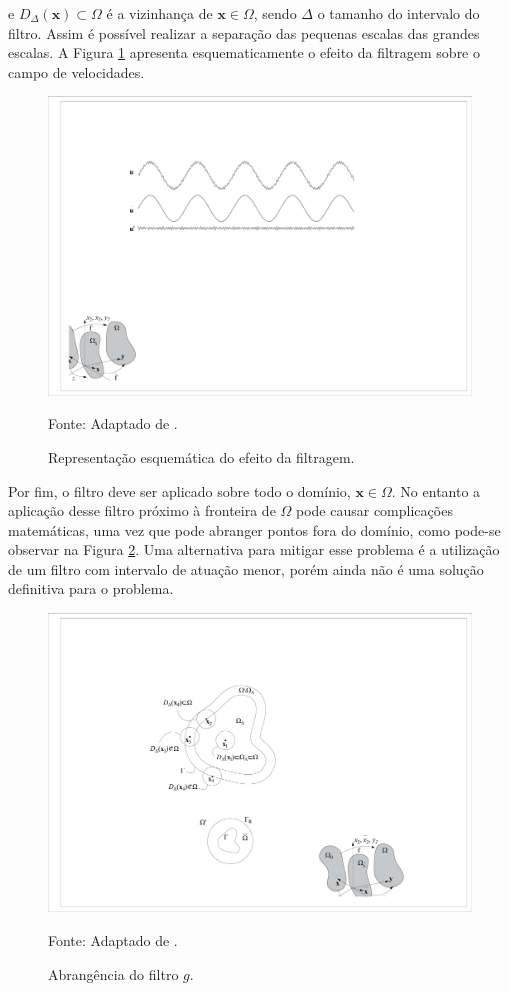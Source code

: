 \documentclass[_ArquivoPrincipal.tex]{subfiles}
\begin{document}
\noindent e $D_\Delta(\mathbf{x})\subset\Omega$ é a vizinhança de $\mathbf{x}\in\Omega$, sendo $\Delta$ o tamanho do intervalo do filtro. Assim é possível realizar a separação das pequenas escalas das grandes escalas. A Figura \ref{fig:Filtragem} apresenta esquematicamente o efeito da filtragem sobre o campo de velocidades.

\begin{figure}[h]
    \centering
    \includegraphics[width=0.75\linewidth]{Figuras/Filtragem.pdf}
    \caption{Representação esquemática do efeito da filtragem.}
    Fonte: Adaptado de .
    \label{fig:Filtragem}
\end{figure}

Por fim, o filtro deve ser aplicado sobre todo o domínio, $\mathbf{x}\in\Omega$. No entanto a aplicação desse filtro próximo à fronteira de $\Omega$ pode causar complicações matemáticas, uma vez que pode abranger pontos fora do domínio, como pode-se observar na Figura \ref{fig:AbrFiltro}. Uma alternativa para mitigar esse problema é a utilização de um filtro com intervalo de atuação menor, porém ainda não é uma solução definitiva para o problema.

\begin{figure}[h]
    \centering
    \includegraphics[width=0.5\linewidth]{Figuras/AbrFiltro.pdf}
    \caption{Abrangência do filtro $g$.}
    Fonte: Adaptado de .
    \label{fig:AbrFiltro}
\end{figure}
\end{document}
